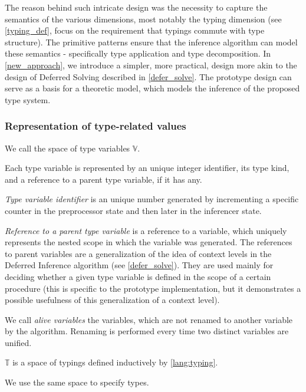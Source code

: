 The reason behind such intricate design was the necessity to capture the semantics of the various dimensions, most notably the typing dimension (see \cref{typing_def}, focus on the requirement that typings commute with type structure). The primitive patterns ensure that the inference algorithm can model these semantics - specifically type application and type decomposition. In \cref{new_approach}, we introduce a simpler, more practical, design more akin to the design of Deferred Solving described in \cref{defer_solve}. The prototype design can serve as a basis for a theoretic model, which models the inference of the proposed type system.

\subsubsection{Representation of type-related values}

\begin{defn}
    \label{def:tyvar}
    We call the space of type variables $\mathbb{V}$.

    Each type variable is represented by an unique integer identifier, its type kind, and a reference to a parent type variable, if it has any.

    \emph{Type variable identifier} is an unique number generated by incrementing a specific counter in the preprocessor state and then later in the inferencer state.

    \emph{Reference to a parent type variable} is a reference to a variable, which uniquely represents the nested scope in which the variable was generated. The references to parent variables are a generalization of the idea of context levels in the Deferred Inference algorithm (see \cref{defer_solve}). They are used mainly for deciding whether a given type variable is defined in the scope of a certain procedure (this is specific to the prototype implementation, but it demonstrates a possible usefulness of this generalization of a context level).
\end{defn}

\begin{defn}
    We call \emph{alive variables} the variables, which are not renamed to another variable by the algorithm. Renaming is performed every time two distinct variables are unified.
\end{defn}

\begin{defn}
    \label{typing_gram}
    $\mathbb{T}$ is a space of typings defined inductively by \cref{lang:typing}.

    We use the same space to specify types.
\end{defn}

